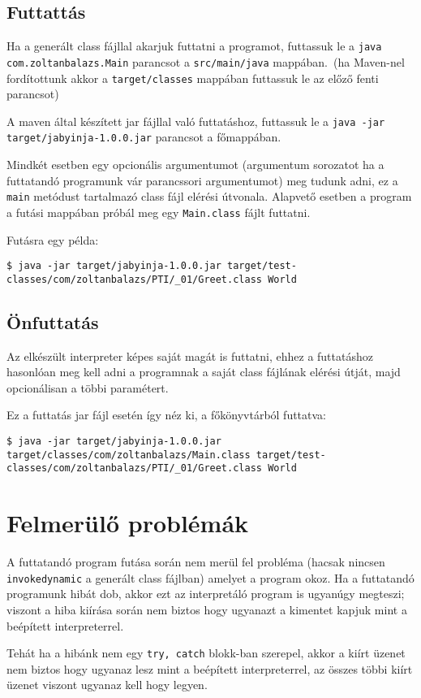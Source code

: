 \subsection{Futtattás}

Ha a generált class fájllal akarjuk futtatni a programot, futtassuk le a \lstinline{java com.zoltanbalazs.Main} parancsot a \lstinline{src/main/java} mappában.\ (ha Maven-nel fordítottunk akkor a \lstinline{target/classes} mappában futtassuk le az előző fenti parancsot)

A maven által készített jar fájllal való futtatáshoz, futtassuk le a \lstinline{java -jar target/jabyinja-1.0.0.jar} parancsot a főmappában.

Mindkét esetben egy opcionális argumentumot (argumentum sorozatot ha a futtatandó programunk vár parancssori argumentumot) meg tudunk adni, ez a \lstinline{main} metódust tartalmazó class fájl elérési útvonala. Alapvető esetben a program a futási mappában próbál meg egy \lstinline{Main.class} fájlt futtatni.

Futásra egy példa:
\begin{verbatim}
$ java -jar target/jabyinja-1.0.0.jar target/test-classes/com/zoltanbalazs/PTI/_01/Greet.class World
\end{verbatim}

\subsection{Önfuttatás}

Az elkészült interpreter képes saját magát is futtatni, ehhez a futtatáshoz hasonlóan meg kell adni a programnak a saját class fájlának elérési útját, majd opcionálisan a többi paramétert.

Ez a futtatás jar fájl esetén így néz ki, a főkönyvtárból futtatva:
\begin{verbatim}
$ java -jar target/jabyinja-1.0.0.jar target/classes/com/zoltanbalazs/Main.class target/test-classes/com/zoltanbalazs/PTI/_01/Greet.class World
\end{verbatim}

\section{Felmerülő problémák}

A futtatandó program futása során nem merül fel probléma (hacsak nincsen \lstinline{invokedynamic} a generált class fájlban) amelyet a program okoz. Ha a futtatandó programunk hibát dob, akkor ezt az interpretáló program is ugyanúgy megteszi; viszont a hiba kiírása során nem biztos hogy ugyanazt a kimentet kapjuk mint a beépített interpreterrel.

Tehát ha a hibánk nem egy \lstinline{try, catch} blokk-ban szerepel, akkor a kiírt üzenet nem biztos hogy ugyanaz lesz mint a beépített interpreterrel, az összes többi kiírt üzenet viszont ugyanaz kell hogy legyen.